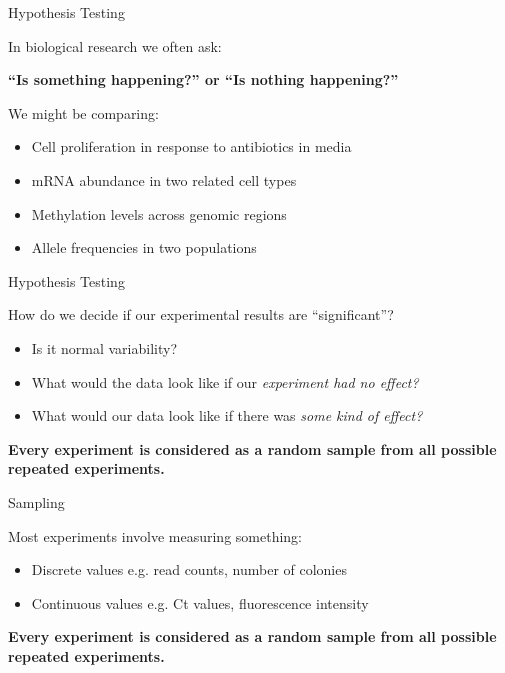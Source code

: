 \documentclass[aspectratio=169,11pt]{beamer}
\begin{document}
\begin{frame}{Hypothesis Testing}

In biological research we often ask:

	\begin{center}
	\textbf{“Is something happening?” or “Is nothing happening?”}
	\end{center}

We might be comparing:

	\begin{itemize}
		\item Cell proliferation in response to antibiotics in media
		\item mRNA abundance in two related cell types
		\item Methylation levels across genomic regions
		\item Allele frequencies in two populations
	\end{itemize}

\end{frame}

\begin{frame}{Hypothesis Testing}

	How do we decide if our experimental results are “significant”?

	\begin{itemize}
		\item Is it normal variability?
		\item What would the data look like if our \textit{experiment had no effect?}
		\item What would our data look like if there was \textit{some kind of effect?}
	\end{itemize}
	
	\textbf{Every experiment is considered as a random sample from all possible repeated experiments.}

\end{frame}

\begin{frame}{Sampling}

Most experiments involve measuring something:

	\begin{itemize}
		\item Discrete values e.g. read counts, number of colonies
		\item Continuous values e.g. Ct values, fluorescence intensity
	\end{itemize}

	\textbf{Every experiment is considered as a random sample from all possible repeated experiments.}

\end{frame}
\end{document}
